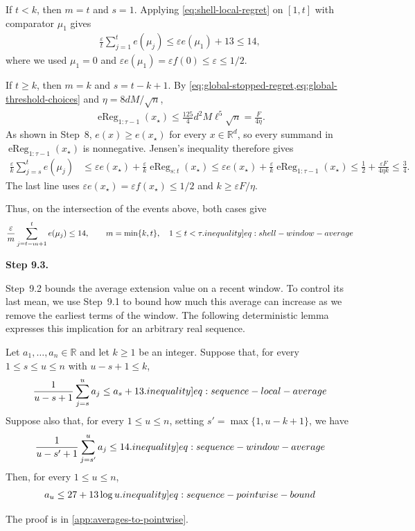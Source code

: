 \documentclass[12pt,cleveref]{jmlr}
\newcommand{\ineqlabel}[1]{\label[inequality]{#1}}
\newcommand{\proofstepinline}[1]{%
    \par\addvspace{0.6\baselineskip}
    \noindent
    {\normalfont\normalsize\bfseries\color{blue!55!black}Step #1.}\enspace\ignorespaces
}
\newcommand{\R}{\mathbb R}
\newcommand{\1}{\mathbf 1}
\newcommand{\eps}{\varepsilon}
\begin{document}
If $t<k$, then $m=t$ and $s=1$.
Applying \cref{eq:shell-local-regret} on $[1,t]$ with comparator $\mu_1$
gives
\begin{align}
    \frac{\eps}{t}\sum_{j=1}^{t}e(\mu_j)
    \leq\eps e(\mu_1)+13
    \leq14,
\end{align}
where we used $\mu_1=0$ and
$\eps e(\mu_1)=\eps f(0)\leq\eps\leq1/2$.

If $t\geq k$, then $m=k$ and $s=t-k+1$.
By \cref{eq:global-stopped-regret,eq:global-threshold-choices} and
$\eta=8dM/\sqrt n$,
\begin{align}
    \operatorname{eReg}_{1:\tau-1}(x_\star)
    \leq\frac{125}{4}d^2M\ell^5\sqrt n
    =\frac{F}{4\eta}.
\end{align}
As shown in Step~8, $e(x)\geq e(x_\star)$ for every $x\in\R^d$,
so every summand in $\operatorname{eReg}_{1:\tau-1}(x_\star)$ is
nonnegative. Jensen's inequality therefore gives
\begin{align}
    \frac{\eps}{k}\sum_{j=s}^{t}e(\mu_j)
    & \leq\eps e(x_\star)
    +\frac{\eps}{k}\operatorname{eReg}_{s:t}(x_\star)
    \leq\eps e(x_\star)
    +\frac{\eps}{k}\operatorname{eReg}_{1:\tau-1}(x_\star)
    \leq\frac12+\frac{\eps F}{4\eta k}
    \leq\frac34.
\end{align}
The last line uses $\eps e(x_\star)=\eps f(x_\star)\leq1/2$ and
$k\geq\eps F/\eta$.

Thus, on the intersection of the events above, both cases give
\begin{align}
    \frac{\eps}{m}\sum_{j=t-m+1}^{t}e(\mu_j)
    \leq14,
    \qquad m=\min\{k,t\},\quad 1\leq t<\tau.
    \ineqlabel{eq:shell-window-average}
\end{align}

\proofstepinline{9.3}
Step~9.2 bounds the average extension value on a recent window.
To control its last mean, we use Step~9.1 to bound how much this average
can increase as we remove the earliest terms of the window.
The following deterministic lemma expresses this implication for an
arbitrary real sequence.
\begin{lemma}
    \label{lem:averages-to-pointwise}
    Let $a_1,\ldots,a_n\in\R$ and let $k\geq1$ be an integer.
    Suppose that, for every $1\leq s\leq u\leq n$ with $u-s+1\leq k$,
    \begin{align}
        \frac{1}{u-s+1}\sum_{j=s}^{u}a_j
        \leq a_s+13.
        \ineqlabel{eq:sequence-local-average}
    \end{align}
    Suppose also that, for every $1\leq u\leq n$, setting
    $s'=\max\{1,u-k+1\}$, we have
    \begin{align}
        \frac{1}{u-s'+1}\sum_{j=s'}^{u}a_j
        \leq14.
        \ineqlabel{eq:sequence-window-average}
    \end{align}
    Then, for every $1\leq u\leq n$,
    \begin{align}
        a_u\leq27+13\log u.
        \ineqlabel{eq:sequence-pointwise-bound}
    \end{align}
\end{lemma}
The proof is in \cref{app:averages-to-pointwise}.
\end{document}
